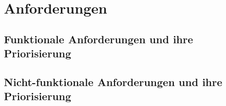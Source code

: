 \chapter{Anforderungen}\label{ch:anforderungen}


\section{Funktionale Anforderungen und ihre Priorisierung}\label{sec:funktionale-anforderungen}


\section{Nicht-funktionale Anforderungen und ihre Priorisierung}\label{sec:nicht-funktionale-anforderungen}

